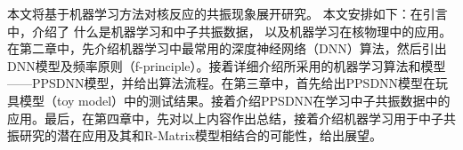 本文将基于机器学习方法对核反应的共振现象展开研究。
本文安排如下：在引言中，介绍了
什么是机器学习和中子共振数据，
以及机器学习在核物理中的应用。在第二章中，先介绍机器学习中最常用的深度神经网络（DNN）算法，然后引出DNN模型及频率原则（f-principle）。接着详细介绍所采用的机器学习算法和模型——PPSDNN模型，并给出算法流程。在第三章中，首先给出PPSDNN模型在玩具模型（toy model）中的测试结果。接着介绍PPSDNN在学习中子共振数据中的应用。最后，在第四章中，先对以上内容作出总结，接着介绍机器学习用于中子共振研究的潜在应用及其和R-Matrix模型相结合的可能性，给出展望。


